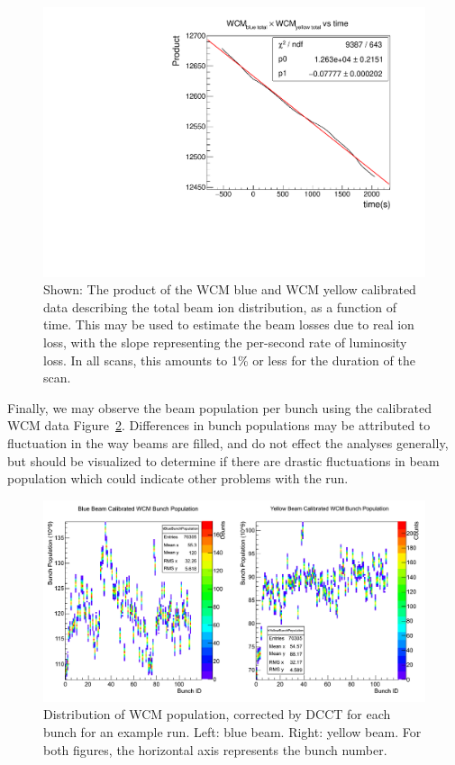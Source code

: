 \begin{figure}
  \centering
  \includegraphics[width=\linewidth]{./figures/wcm_rate_loss.pdf}
  \caption{
    Shown: The product of the WCM blue and WCM yellow calibrated data describing
    the total beam ion distribution, as a function of time. This may be used to
    estimate the beam losses due to real ion loss, with the slope representing
    the per-second rate of luminosity loss. In all scans, this amounts to 1\% or
    less for the duration of the scan.
  }
  \label{fig:wcm_rate_loss}
\end{figure}

Finally, we may observe the beam population per bunch using the calibrated WCM
data Figure~\ref{fig:bunch_population_example}. Differences in bunch populations
may be attributed to fluctuation in the way beams are filled, and do not effect
the analyses generally, but should be visualized to determine if there are
drastic fluctuations in beam population which could indicate other problems with
the run.

\begin{figure}
  \centering
  \includegraphics[width=\linewidth]{./figures/359711_bunch_population.png}
  \caption{
    Distribution of WCM population, corrected by DCCT for each bunch for an
    example run. Left: blue beam. Right: yellow beam. For both figures, the
    horizontal axis represents the bunch number.
  }
  \label{fig:bunch_population_example}
\end{figure}

